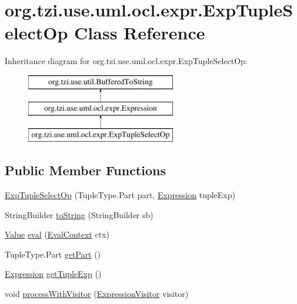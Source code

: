 \hypertarget{classorg_1_1tzi_1_1use_1_1uml_1_1ocl_1_1expr_1_1_exp_tuple_select_op}{\section{org.\-tzi.\-use.\-uml.\-ocl.\-expr.\-Exp\-Tuple\-Select\-Op Class Reference}
\label{classorg_1_1tzi_1_1use_1_1uml_1_1ocl_1_1expr_1_1_exp_tuple_select_op}
}
Inheritance diagram for org.\-tzi.\-use.\-uml.\-ocl.\-expr.\-Exp\-Tuple\-Select\-Op\-:\begin{figure}[H]
\begin{center}
\leavevmode
\includegraphics[height=3.000000cm]{classorg_1_1tzi_1_1use_1_1uml_1_1ocl_1_1expr_1_1_exp_tuple_select_op}
\end{center}
\end{figure}
\subsection*{Public Member Functions}
\begin{DoxyCompactItemize}
\item 
\hyperlink{classorg_1_1tzi_1_1use_1_1uml_1_1ocl_1_1expr_1_1_exp_tuple_select_op_aa0e51ca65e32fe191f4aeae7567ad6a6}{Exp\-Tuple\-Select\-Op} (Tuple\-Type.\-Part part, \hyperlink{classorg_1_1tzi_1_1use_1_1uml_1_1ocl_1_1expr_1_1_expression}{Expression} tuple\-Exp)
\item 
String\-Builder \hyperlink{classorg_1_1tzi_1_1use_1_1uml_1_1ocl_1_1expr_1_1_exp_tuple_select_op_a0e074cdd87065dff2d9ce631eb042b44}{to\-String} (String\-Builder sb)
\item 
\hyperlink{classorg_1_1tzi_1_1use_1_1uml_1_1ocl_1_1value_1_1_value}{Value} \hyperlink{classorg_1_1tzi_1_1use_1_1uml_1_1ocl_1_1expr_1_1_exp_tuple_select_op_a1222d4dee28f52750223fed37a533340}{eval} (\hyperlink{classorg_1_1tzi_1_1use_1_1uml_1_1ocl_1_1expr_1_1_eval_context}{Eval\-Context} ctx)
\item 
Tuple\-Type.\-Part \hyperlink{classorg_1_1tzi_1_1use_1_1uml_1_1ocl_1_1expr_1_1_exp_tuple_select_op_a55a8670d61e3cbf1b1226558bd0f2fa7}{get\-Part} ()
\item 
\hyperlink{classorg_1_1tzi_1_1use_1_1uml_1_1ocl_1_1expr_1_1_expression}{Expression} \hyperlink{classorg_1_1tzi_1_1use_1_1uml_1_1ocl_1_1expr_1_1_exp_tuple_select_op_a360bccbabdccdcdcb33cb021780ee376}{get\-Tuple\-Exp} ()
\item 
void \hyperlink{classorg_1_1tzi_1_1use_1_1uml_1_1ocl_1_1expr_1_1_exp_tuple_select_op_ad6cf42ab64f0e9396adfb0079b9264e2}{process\-With\-Visitor} (\hyperlink{interfaceorg_1_1tzi_1_1use_1_1uml_1_1ocl_1_1expr_1_1_expression_visitor}{Expression\-Visitor} visitor)
\end{DoxyCompactItemize}
